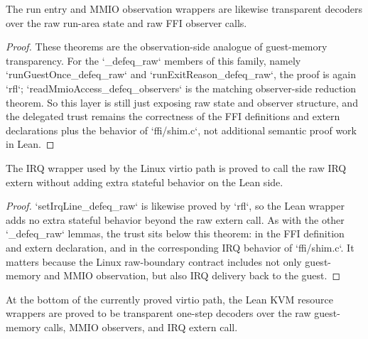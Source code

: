 \begin{theorem}
\label{thm:kvm-mmio-observer-transparency}
\leanok
The run entry and MMIO observation wrappers are likewise transparent decoders over the raw run-area state and raw FFI observer calls.
\end{theorem}

\begin{proof}
\leanok
These theorems are the observation-side analogue of guest-memory transparency.
For the `_defeq_raw` members of this family, namely `runGuestOnce_defeq_raw` and `runExitReason_defeq_raw`, the proof is again `rfl`; `readMmioAccess_defeq_observers` is the matching observer-side reduction theorem.
So this layer is still just exposing raw state and observer structure, and the delegated trust remains the correctness of the FFI definitions and extern declarations plus the behavior of `ffi/shim.c`, not additional semantic proof work in Lean.
\end{proof}

\begin{theorem}
\label{thm:kvm-irq-transparency}
\leanok
The IRQ wrapper used by the Linux virtio path is proved to call the raw IRQ extern without adding extra stateful behavior on the Lean side.
\end{theorem}

\begin{proof}
\leanok
`setIrqLine_defeq_raw` is likewise proved by `rfl`, so the Lean wrapper adds no extra stateful behavior beyond the raw extern call.
As with the other `_defeq_raw` lemmas, the trust sits below this theorem: in the FFI definition and extern declaration, and in the corresponding IRQ behavior of `ffi/shim.c`.
It matters because the Linux raw-boundary contract includes not only guest-memory and MMIO observation, but also IRQ delivery back to the guest.
\end{proof}

\begin{theorem}
\label{thm:kvm-wrapper-transparency}
\leanok
At the bottom of the currently proved virtio path, the Lean KVM resource wrappers are proved to be transparent one-step decoders over the raw guest-memory calls, MMIO observers, and IRQ extern call.
\end{theorem}


